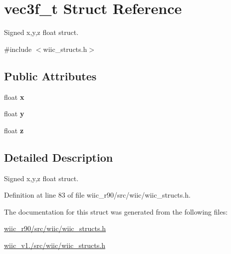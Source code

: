 \hypertarget{structvec3f__t}{\section{vec3f\-\_\-t Struct Reference}
\label{structvec3f__t}
}


Signed x,y,z float struct.  




{\ttfamily \#include $<$wiic\-\_\-structs.\-h$>$}

\subsection*{Public Attributes}
\begin{DoxyCompactItemize}
\item 
\hypertarget{structvec3f__t_a60f26fe901d34ae1b005343ef46b0eb9}{float {\bfseries x}}\label{structvec3f__t_a60f26fe901d34ae1b005343ef46b0eb9}

\item 
\hypertarget{structvec3f__t_a0758f3425f05e7419d04b3e7e588dbac}{float {\bfseries y}}\label{structvec3f__t_a0758f3425f05e7419d04b3e7e588dbac}

\item 
\hypertarget{structvec3f__t_a7994ca5509a9bc1c5ad399a31bdef420}{float {\bfseries z}}\label{structvec3f__t_a7994ca5509a9bc1c5ad399a31bdef420}

\end{DoxyCompactItemize}


\subsection{Detailed Description}
Signed x,y,z float struct. 

Definition at line 83 of file wiic\-\_\-r90/src/wiic/wiic\-\_\-structs.\-h.



The documentation for this struct was generated from the following files\-:\begin{DoxyCompactItemize}
\item 
\hyperlink{wiic__r90_2src_2wiic_2wiic__structs_8h}{wiic\-\_\-r90/src/wiic/wiic\-\_\-structs.\-h}\item 
\hyperlink{wiic__v1_81_2src_2wiic_2wiic__structs_8h}{wiic\-\_\-v1./src/wiic/wiic\-\_\-structs.\-h}\end{DoxyCompactItemize}
